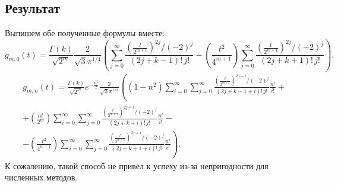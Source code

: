 \documentclass[../../paper.tex]{subfiles}
\begin{document}
\subsection{Результат}
Выпишем обе полученные формулы вместе:
\[
    g_{m,0}(t) =
%
    \frac{\Gamma(k)}{\sqrt{2^m}}
    \frac{2}{\sqrt{3} \pi^{1/4}} \left(
%
    \sum_{j=0}^{\infty} \frac{\left(\frac{t}{2^{m+1}}\right)^{2j} / (-2)^j}{(2j+k-1)!\,j!}
-
    \left( \frac{t^2}{4^{m+1}} \right) 
    \sum_{j=0}^{\infty} \frac{\left(\frac{t}{2^{m+1}}\right)^{2j} / (-2)^j}{(2j+k+1)!\,j!}
%
    \right)
.\]
\begin{multline*}
    g_{m,n}(t)
=
    \frac{\Gamma(k)}{\sqrt{2^m}} e^{-\frac{n^2}{2}} \frac{2}{\sqrt{3} \pi^{1/4}} \left(
    \left( 1-n^2 \right) 
    \sum_{i=0}^{\infty} \sum_{j=0}^{\infty} \frac{\left( \frac{t}{2^{m+1}} \right) ^{2j+i} / (-2)^j}{(2j+k-1+i)!\,j!} \frac{n^i}{i!}
\right. +\\+
    \left( \frac{nt}{2^m} \right) 
    \sum_{i=0}^{\infty} \sum_{j=0}^{\infty} \frac{\left( \frac{t}{2^{m+1}} \right) ^{2j+i} / (-2)^j}{(2j+k+i)!\,j!} \frac{n^i}{i!}
-\\- \left.
    \left( \frac{t^2}{4^{m+1}} \right) 
    \sum_{i=0}^{\infty} \sum_{j=0}^{\infty} \frac{\left( \frac{t}{2^{m+1}} \right) ^{2j+i} / (-2)^j}{(2j+k+1+i)!\,j!} \frac{n^i}{i!}
    \right)
.\end{multline*}
%
К сожалению, такой способ не привел к успеху из-за непригодности для численных методов.
\end{document}
